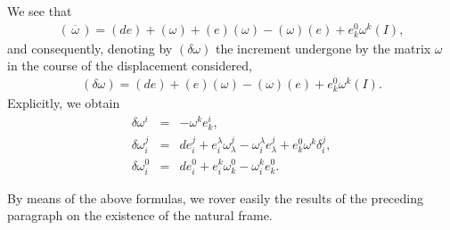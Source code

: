 We see that 
\begin{eqnarray*}
(\, \overline \omega\, ) = (de) + (\omega) + (e) (\omega)  - (\omega) (e) + e^0_k \omega^k (I) ,
\end{eqnarray*}
and consequently, denoting by $(\delta \omega)$ the increment undergone by the matrix $\omega$ in the course of the displacement considered, 
\begin{eqnarray}
(\delta \omega) = (de)  + (e) (\omega)  - (\omega) (e) + e^0_k \omega^k (I)  .
\label{eq:1-9}
\end{eqnarray}
Explicitly, we obtain
\begin{eqnarray*}
\delta \omega^i &=& - \omega^k e^i_k , \\
\delta \omega^j_i &=& de^j_i + e^\lambda_i \omega^j_\lambda - \omega^\lambda_i e^j_\lambda + e^0_k \omega^k \delta^j_i , \\
\delta \omega^0_i &=& de^0_i + e^k_i \omega^0_k - \omega^k_i e^0_k .
\end{eqnarray*}

By means of the above formulas, we rover easily the results of the preceding paragraph on the existence of the natural frame.







































































































